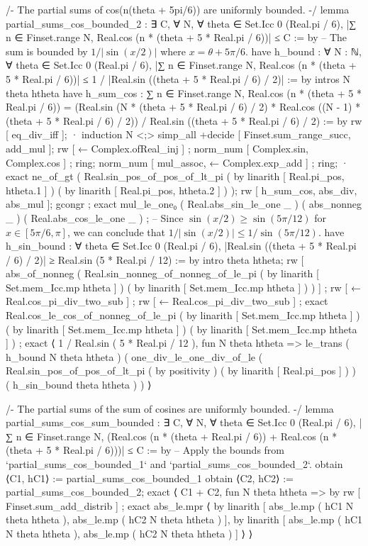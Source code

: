 /-
The partial sums of cos(n(theta + 5pi/6)) are uniformly bounded.
-/
lemma partial_sums_cos_bounded_2 :
  ∃ C, ∀ N, ∀ theta ∈ Set.Icc 0 (Real.pi / 6), |∑ n ∈ Finset.range N, Real.cos (n * (theta + 5 * Real.pi / 6))| ≤ C := by
    -- The sum is bounded by $1/|\sin(x/2)|$ where $x = \theta + 5\pi/6$.
    have h_bound : ∀ N : ℕ, ∀ theta ∈ Set.Icc 0 (Real.pi / 6), |∑ n ∈ Finset.range N, Real.cos (n * (theta + 5 * Real.pi / 6))| ≤ 1 / |Real.sin ((theta + 5 * Real.pi / 6) / 2)| := by
      intros N theta htheta
      have h_sum_cos : ∑ n ∈ Finset.range N, Real.cos (n * (theta + 5 * Real.pi / 6)) = (Real.sin (N * (theta + 5 * Real.pi / 6) / 2) * Real.cos ((N - 1) * (theta + 5 * Real.pi / 6) / 2)) / Real.sin ((theta + 5 * Real.pi / 6) / 2) := by
        rw [ eq_div_iff ];
        · induction N <;> simp_all +decide [ Finset.sum_range_succ, add_mul ];
          rw [ ← Complex.ofReal_inj ] ; norm_num [ Complex.sin, Complex.cos ] ; ring;
          norm_num [ mul_assoc, ← Complex.exp_add ] ; ring;
        · exact ne_of_gt ( Real.sin_pos_of_pos_of_lt_pi ( by linarith [ Real.pi_pos, htheta.1 ] ) ( by linarith [ Real.pi_pos, htheta.2 ] ) );
      rw [ h_sum_cos, abs_div, abs_mul ];
      gcongr ; exact mul_le_one₀ ( Real.abs_sin_le_one _ ) ( abs_nonneg _ ) ( Real.abs_cos_le_one _ ) ;
    -- Since $\sin(x/2) \geq \sin(5\pi/12)$ for $x \in [5\pi/6, \pi]$, we can conclude that $1/|\sin(x/2)| \leq 1/\sin(5\pi/12)$.
    have h_sin_bound : ∀ theta ∈ Set.Icc 0 (Real.pi / 6), |Real.sin ((theta + 5 * Real.pi / 6) / 2)| ≥ Real.sin (5 * Real.pi / 12) := by
      intro theta htheta; rw [ abs_of_nonneg ( Real.sin_nonneg_of_nonneg_of_le_pi ( by linarith [ Set.mem_Icc.mp htheta ] ) ( by linarith [ Set.mem_Icc.mp htheta ] ) ) ] ; rw [ ← Real.cos_pi_div_two_sub ] ; rw [ ← Real.cos_pi_div_two_sub ] ; exact Real.cos_le_cos_of_nonneg_of_le_pi ( by linarith [ Set.mem_Icc.mp htheta ] ) ( by linarith [ Set.mem_Icc.mp htheta ] ) ( by linarith [ Set.mem_Icc.mp htheta ] ) ;
    exact ⟨ 1 / Real.sin ( 5 * Real.pi / 12 ), fun N theta htheta => le_trans ( h_bound N theta htheta ) ( one_div_le_one_div_of_le ( Real.sin_pos_of_pos_of_lt_pi ( by positivity ) ( by linarith [ Real.pi_pos ] ) ) ( h_sin_bound theta htheta ) ) ⟩

/-
The partial sums of the sum of cosines are uniformly bounded.
-/
lemma partial_sums_cos_sum_bounded :
  ∃ C, ∀ N, ∀ theta ∈ Set.Icc 0 (Real.pi / 6),
  |∑ n ∈ Finset.range N, (Real.cos (n * (theta + Real.pi / 6)) + Real.cos (n * (theta + 5 * Real.pi / 6)))| ≤ C := by
    -- Apply the bounds from `partial_sums_cos_bounded_1` and `partial_sums_cos_bounded_2`.
    obtain ⟨C1, hC1⟩ := partial_sums_cos_bounded_1
    obtain ⟨C2, hC2⟩ := partial_sums_cos_bounded_2;
    exact ⟨ C1 + C2, fun N theta htheta => by rw [ Finset.sum_add_distrib ] ; exact abs_le.mpr ⟨ by linarith [ abs_le.mp ( hC1 N theta htheta ), abs_le.mp ( hC2 N theta htheta ) ], by linarith [ abs_le.mp ( hC1 N theta htheta ), abs_le.mp ( hC2 N theta htheta ) ] ⟩ ⟩

